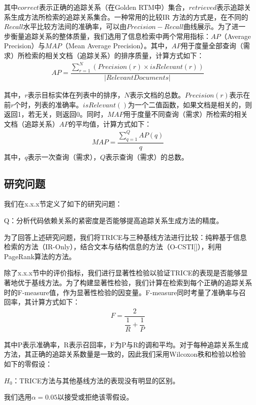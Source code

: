 其中$correct$表示正确的追踪关系（在Golden RTM中）集合，$retrieved$表示追踪关系生成方法所检索的追踪关系集合。一种常用的比较IR
方法的方式是，在不同的$Recall$水平比较方法间的准确率，可以由$Precision-Recall$曲线展示。为了进一步衡量追踪关系的整体质量，我们选用了信息检索中两个常用指标：$AP$（Average Precision）与$MAP$（Mean Average Precision）。其中，$AP$用于度量全部查询（需求）所检索的相关文档（追踪关系）的排序质量，计算方式如下：
\begin{align}
AP=\dfrac {\sum _{r=1}^{N}\left( Precision\left( r\right) \times isRelevant\left( r\right) \right) } {\left| RelevantDocuments\right| }
\end{align}

其中，$r$表示目标实体在列表中的排序，$N$表示文档的总数。$Precision(r)$表示在前$r$个时，列表的准确率。$isRelevant()$为一个二值函数，如果文档是相关的，则返回1，若无关，则返回0。同时，$MAP$用于度量不同查询（需求）所检索的相关文档（追踪关系）$AP$的平均值，计算方式如下：
\begin{align}
MAP=\dfrac {\sum _{q=1}^{Q}AP\left( q\right)} {q}
\end{align}
其中，$q$表示一次查询（需求），$Q$表示查询（需求）的总数。

\subsection{研究问题}
我们在x.x.x节定义了如下的研究问题：

Q：分析代码依赖关系的紧密度是否能够提高追踪关系生成方法的精度。

为了回答上述研究问题，我们将TRICE与三种基线方法进行比较：纯粹基于信息检索的方法（IR-Only），结合文本与结构信息的方法（O-CSTI[]），利用PageRank算法的方法。

除了x.x.x节中的评价指标，我们进行显著性检验以验证TRICE的表现是否能够显著地优于基线方法。为了构建显著性检验，我们计算在检索到每个正确的追踪关系时的F-measure值，作为显著性检验的因变量。F-measure同时考量了准确率与召回率，其计算方式如下：
\begin{align}
F=\dfrac {2} {\dfrac {1} {R}+\dfrac {1} {P}}\end{align}

其中P表示准确率，R表示召回率，F为P与R的调和平均。对于每种追踪关系生成方法，其正确的追踪关系数量是一致的，因此我们采用Wilcoxon秩和检验以检验如下的零假设：

$H_{0}$：TRICE方法与其他基线方法的表现没有明显的区别。

我们选用$\alpha = 0.05$以接受或拒绝该零假设。

